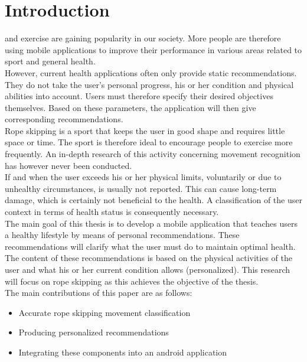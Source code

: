 \documentclass[twocolumn]{phdsymp} %
\begin{document}
\section{Introduction}
 and exercise are gaining popularity in our society. More people are therefore using mobile applications to improve their performance in various areas related to sport and general health. \\
\noindent
However, current health applications often only provide static recommendations. They do not take the user's personal progress, his or her condition and physical abilities into account. Users must therefore specify their desired objectives themselves. Based on these parameters, the application will then give corresponding recommendations. \\
\noindent
Rope skipping is a sport that keeps the user in good shape and requires little space or time. The sport is therefore ideal to encourage people to exercise more frequently. An in-depth research of this activity concerning movement recognition has however never been conducted. \\
\noindent
If and when the user exceeds his or her physical limits, voluntarily or due to unhealthy circumstances, is usually not reported. This can cause long-term damage, which is certainly not beneficial to the health. A classification of the user context in terms of health status is consequently necessary. \\
\noindent
The main goal of this thesis is to develop a mobile application that teaches users a healthy lifestyle by means of personal recommendations. These recommendations will clarify what the user must do to maintain optimal health. The content of these recommendations is based on the physical activities of the user and what his or her current condition allows (personalized). This research will focus on rope skipping as this achieves the objective of the thesis. \\

\noindent
The main contributions of this paper are as follows:\\
\begin{itemize}[leftmargin=.1in]
\raggedright
\setlength\itemsep{0.7em}
    \item Accurate rope skipping movement classification
    \item Producing personalized recommendations
    \item Integrating these components into an android application
\end{itemize}
\bigskip 
\end{document}
